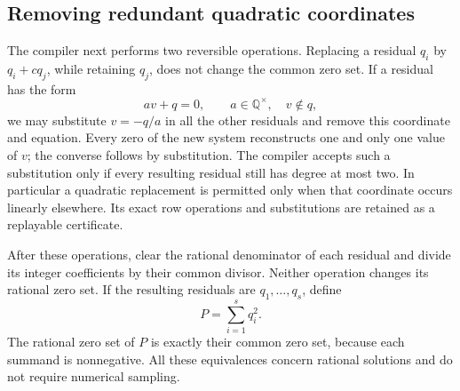 \documentclass[11pt]{article}
\theoremstyle{definition}
\begin{document}
\subsection{Removing redundant quadratic coordinates}

The compiler next performs two reversible operations.  Replacing a
residual $q_i$ by $q_i+cq_j$, while retaining $q_j$, does not change the
common zero set.  If a residual has the form
\[
                  av+q=0,\qquad a\in\mathbb Q^\times,
                  \quad v\notin q,
\]
we may substitute $v=-q/a$ in all the other residuals and remove this
coordinate and equation.  Every zero of the new system reconstructs one
and only one value of $v$; the converse follows by substitution.  The
compiler accepts such a substitution only if every resulting residual
still has degree at most two.  In particular a quadratic replacement is
permitted only when that coordinate occurs linearly elsewhere.  Its exact
row operations and substitutions are retained as a replayable certificate.

After these operations, clear the rational denominator of each residual
and divide its integer coefficients by their common divisor.  Neither
operation changes its rational zero set.  If the resulting residuals are
$q_1,\ldots,q_s$, define
\[
                         P=\sum_{i=1}^s q_i^2.
\]
The rational zero set of $P$ is exactly their common zero set, because
each summand is nonnegative.  All these equivalences concern rational
solutions and do not require numerical sampling.
\end{document}
